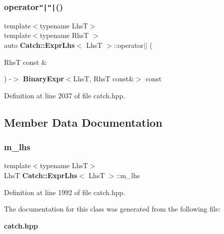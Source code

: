 \subsubsection{operator\texttt{"|}\texttt{"|}()}
{\footnotesize\ttfamily template$<$typename LhsT$>$ \\
template$<$typename RhsT $>$ \\
auto \textbf{ Catch\+::\+Expr\+Lhs}$<$ LhsT $>$\+::operator$\vert$$\vert$ (\begin{DoxyParamCaption}\item[{RhsT const \&}]{ }\end{DoxyParamCaption}) -\/$>$ \textbf{ Binary\+Expr}$<$LhsT, RhsT const\&$>$ const \hspace{0.3cm}{\ttfamily [inline]}}



Definition at line 2037 of file catch.\+hpp.



\subsection{Member Data Documentation}
\mbox{\label{class_catch_1_1_expr_lhs_af290873a8427ccbdae6acb915fb7366a}} 
\subsubsection{m\_lhs}
{\footnotesize\ttfamily template$<$typename LhsT$>$ \\
LhsT \textbf{ Catch\+::\+Expr\+Lhs}$<$ LhsT $>$\+::m\+\_\+lhs\hspace{0.3cm}{\ttfamily [private]}}



Definition at line 1992 of file catch.\+hpp.



The documentation for this class was generated from the following file\+:\begin{DoxyCompactItemize}
\item 
\textbf{ catch.\+hpp}\end{DoxyCompactItemize}
